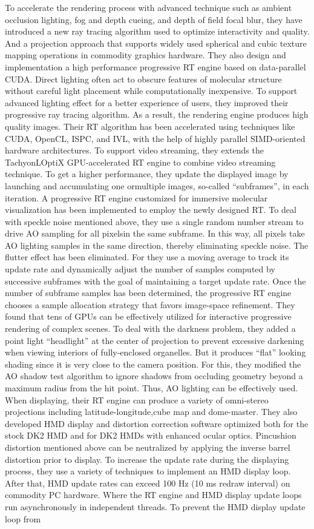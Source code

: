 \documentclass[10pt,twocolumn,letterpaper]{article}
\begin{document}
To accelerate the rendering process with advanced technique such as ambient occlusion lighting, fog and depth cueing, and depth of field focal blur, they have introduced a new ray tracing algorithm used to optimize interactivity and quality. And a projection approach that supports widely used spherical and cubic texture mapping operations in commodity graphics hardware. They also design and implementation a high performance progressive RT engine based on data-parallel CUDA. Direct lighting often act to obscure features of molecular structure without careful light placement while computationally inexpensive. To support advanced lighting effect for a better experience of users, they improved their progressive ray tracing algorithm. As a result, the rendering engine produces high quality images. Their RT algorithm has been accelerated using techniques like CUDA, OpenCL, ISPC, and IVL, with the help of highly parallel SIMD-oriented hardware architectures. To support video streaming, they extends the TachyonLOptiX GPU-accelerated RT engine to combine video streaming technique. To get a higher performance, they update the displayed image by launching and accumulating one ormultiple images, so-called “subframes”, in each iteration. A progressive RT engine customized for immersive molecular visualization has been implemented to employ the newly designed RT. To deal with speckle noise mentioned above, they use a single random number stream to drive AO sampling for all pixelsin the same subframe. In this way, all pixels take AO lighting samples in the same direction, thereby eliminating speckle noise. The flutter effect has been eliminated. For they use a moving average to track its update rate and dynamically adjust the number of samples computed by successive subframes with the goal of maintaining a target update rate. Once the number of subframe samples has been determined, the progressive RT engine chooses a sample allocation strategy that favors image-space refinement. They found that tens of GPUs can be effectively utilized for interactive progressive rendering of complex scenes. To deal with the darkness problem, they added a point light “headlight” at the center of projection to prevent excessive darkening when viewing interiors of fully-enclosed organelles. But it produces “flat” looking shading since it is very close to the camera position. For this, they modified the AO shadow test algorithm to ignore shadows from occluding geometry beyond a maximum radius from the hit point. Thus, AO lighting can be effectively used. When displaying, their RT engine can produce a variety of omni-stereo projections including latitude-longitude,cube map and dome-master. They also developed HMD display and distortion correction software optimized both for the stock DK2 HMD and for DK2 HMDs with enhanced ocular optics. Pincushion distortion mentioned above can be neutralized by applying the inverse barrel distortion prior to display. To increase the update rate during the displaying process, they use a variety of techniques to implement an HMD display loop. After that, HMD update rates can exceed 100 Hz (10 ms redraw interval) on commodity PC hardware. Where the RT engine and HMD display update loops run asynchronously in independent threads. To prevent the HMD display update loop from 
\end{document}
